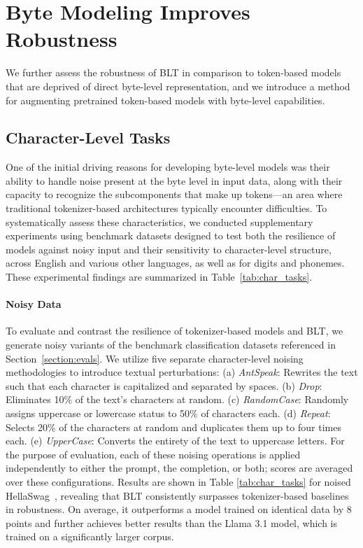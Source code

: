 \section{Byte Modeling Improves Robustness} We further assess the robustness of {\textsc BLT} in comparison to token-based models that are deprived of direct byte-level representation, and we introduce a method for augmenting pretrained token-based models with byte-level capabilities.
\label{sec:robustness}

\subsection{Character-Level Tasks}

One of the initial driving reasons for developing byte-level models was their ability to handle noise present at the byte level in input data, along with their capacity to recognize the subcomponents that make up tokens—an area where traditional tokenizer-based architectures typically encounter difficulties. To systematically assess these characteristics, we conducted supplementary experiments using benchmark datasets designed to test both the resilience of models against noisy input and their sensitivity to character-level structure, across English and various other languages, as well as for digits and phonemes. These experimental findings are summarized in Table~\ref{tab:char_tasks}.

\paragraph{Noisy Data} To evaluate and contrast the resilience of tokenizer-based models and {\textsc BLT}, we generate noisy variants of the benchmark classification datasets referenced in Section~\ref{section:evals}. We utilize five separate character-level noising methodologies to introduce textual perturbations: (a) \textit{AntSpeak}: Rewrites the text such that each character is capitalized and separated by spaces. (b) \textit{Drop}: Eliminates 10\% of the text's characters at random. (c) \textit{RandomCase}: Randomly assigns uppercase or lowercase status to 50\% of characters each. (d) \textit{Repeat}: Selects 20\% of the characters at random and duplicates them up to four times each. (e) \textit{UpperCase}: Converts the entirety of the text to uppercase letters. For the purpose of evaluation, each of these noising operations is applied independently to either the prompt, the completion, or both; scores are averaged over these configurations. Results are shown in Table \ref{tab:char_tasks} for noised HellaSwag~\citep{Eval_hellaswag}, revealing that {\textsc BLT} consistently surpasses tokenizer-based baselines in robustness. On average, it outperforms a model trained on identical data by 8 points and further achieves better results than the Llama 3.1 model, which is trained on a significantly larger corpus.

